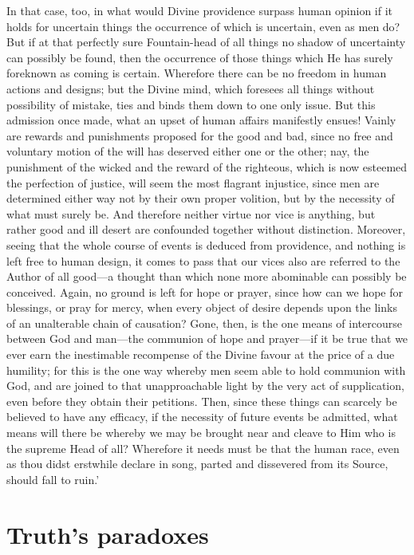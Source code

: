\documentclass[12pt]{book}
\begin{document}
In that case, too, in what would Divine providence surpass human opinion
if it holds for uncertain things the occurrence of which is uncertain,
even as men do? But if at that perfectly sure Fountain-head of all
things no shadow of uncertainty can possibly be found, then the
occurrence of those things which He has surely foreknown as coming is
certain. Wherefore there can be no freedom in human actions and designs;
but the Divine mind, which foresees all things without possibility of
mistake, ties and binds them down to one only issue. But this admission
once made, what an upset of human affairs manifestly ensues! Vainly are
rewards and punishments proposed for the good and bad, since no free and
voluntary motion of the will has deserved either one or the other; nay,
the punishment of the wicked and the reward of the righteous, which is
now esteemed the perfection of justice, will seem the most flagrant
injustice, since men are determined either way not by their own proper
volition, but by the necessity of what must surely be. And therefore
neither virtue nor vice is anything, but rather good and ill desert are
confounded together without distinction. Moreover, seeing that the whole
course of events is deduced from providence, and nothing is left free to
human design, it comes to pass that our vices also are referred to the
Author of all good---a thought than which none more abominable can
possibly be conceived. Again, no ground is left for hope or prayer,
since how can we hope for blessings, or pray for mercy, when every
object of desire depends upon the links of an unalterable chain of
causation? Gone, then, is the one means of intercourse between God and
man---the communion of hope and prayer---if it be true that we ever earn
the inestimable recompense of the Divine favour at the price of a due
humility; for this is the one way whereby men seem able to hold
communion with God, and are joined to that unapproachable light by the
very act of supplication, even before they obtain their petitions. Then,
since these things can scarcely be believed to have any efficacy, if the
necessity of future events be admitted, what means will there be whereby
we may be brought near and cleave to Him who is the supreme Head of all?
Wherefore it needs must be that the human race, even as thou didst
erstwhile declare in song, parted and dissevered from its Source, should
fall to ruin.'




\section{Truth's paradoxes}
\end{document}
